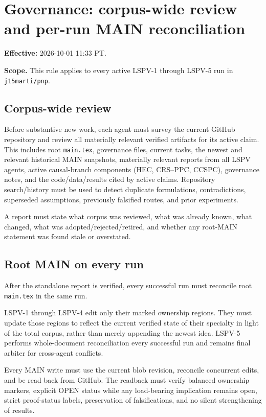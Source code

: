 \documentclass[11pt]{article}
\begin{document}
\section*{Governance: corpus-wide review and per-run MAIN reconciliation}

\textbf{Effective:} 2026-10-01 11:33 PT.

\textbf{Scope.} This rule applies to every active LSPV-1 through LSPV-5 run in
\texttt{j15marti/pnp}.

\subsection*{Corpus-wide review}

Before substantive new work, each agent must survey the current GitHub repository and review all
materially relevant verified artifacts for its active claim. This includes root
\texttt{main.tex}, governance files, current tasks, the newest and relevant historical MAIN
snapshots, materially relevant reports from all LSPV agents, active causal-branch components
(HEC, CRS--PPC, CCSPC), governance notes, and the code/data/results cited by active claims.
Repository search/history must be used to detect duplicate formulations, contradictions,
superseded assumptions, previously falsified routes, and prior experiments.

A report must state what corpus was reviewed, what was already known, what changed, what was
adopted/rejected/retired, and whether any root-MAIN statement was found stale or overstated.

\subsection*{Root MAIN on every run}

After the standalone report is verified, every successful run must reconcile root
\texttt{main.tex} in the same run.

LSPV-1 through LSPV-4 edit only their marked ownership regions. They must update those regions
to reflect the current verified state of their specialty in light of the total corpus, rather than
merely appending the newest idea. LSPV-5 performs whole-document reconciliation every successful
run and remains final arbiter for cross-agent conflicts.

Every MAIN write must use the current blob revision, reconcile concurrent edits, and be read back
from GitHub. The readback must verify balanced ownership markers, explicit OPEN status while any
load-bearing implication remains open, strict proof-status labels, preservation of falsifications,
and no silent strengthening of results.
\end{document}

